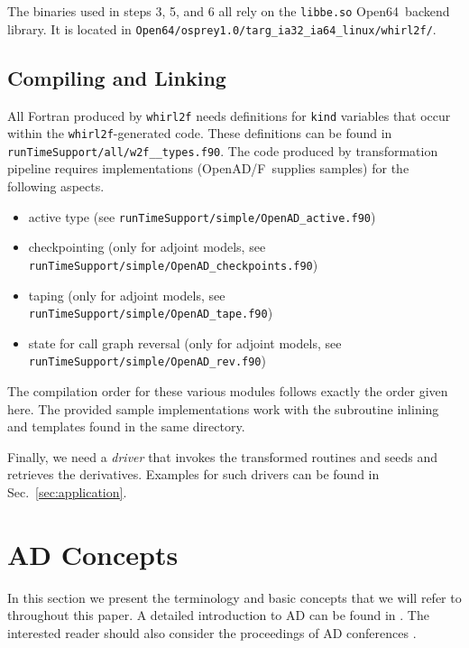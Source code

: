\documentclass{book}
\newcommand{\OpenADF}{OpenAD/F}
\newcommand{\OpenSixtyFour}{Open64}
\newcommand{\code}[1]{{\small\tt{#1}}}
\newcommand{\refsec}[1]{{Sec.~\ref{#1}}}
\begin{document}
The binaries used in steps 3, 5, and 6 all rely on the \code{libbe.so} \OpenSixtyFour\ backend library. 
It is located in \code{Open64/osprey1.0/targ\_ia32\_ia64\_linux/whirl2f/}.
 
\section{Compiling and Linking}\label{sec:compLink}
All Fortran produced by \code{whirl2f} needs definitions for \code{kind} 
variables that occur within the \code{whirl2f}-generated code. 
These definitions can be found in \code{runTimeSupport/all/w2f\_\_types.f90}.
The code produced by  transformation pipeline 
requires  implementations 
(\OpenADF\ supplies samples) for the following aspects.
\begin{itemize}
\item active type (see \code{runTimeSupport/simple/OpenAD\_active.f90})
\item checkpointing (only  for adjoint models, see \code{runTimeSupport/simple/OpenAD\_checkpoints.f90})  
\item taping (only  for adjoint models, see \code{runTimeSupport/simple/OpenAD\_tape.f90})  
\item state for call graph reversal (only  for adjoint models, see \code{runTimeSupport/simple/OpenAD\_rev.f90})
\end{itemize}
The compilation order for these various modules follows exactly the order given here.
The provided sample implementations work with the subroutine inlining and templates found in the same 
directory.

Finally, we need a {\em driver} that invokes the transformed routines and seeds and retrieves the derivatives.
Examples for such drivers can be found in \refsec{sec:application}.

\chapter{AD Concepts}\label{chap:ADIntro}

In this section we present the terminology and basic concepts that 
we will refer to throughout this paper. 
A detailed introduction to AD can be found in \cite{Gri00}.
The interested reader should also consider the proceedings of AD 
conferences \cite{CG91,BBCG96,CFG+01,BCH+06}.
\end{document}
